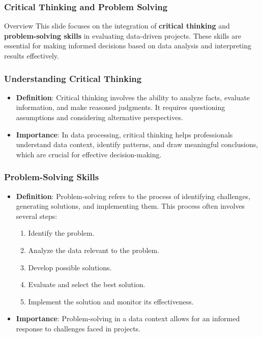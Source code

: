 \documentclass[aspectratio=169]{beamer}
\begin{document}
\begin{frame}[fragile]
    \frametitle{Critical Thinking and Problem Solving}
    \begin{block}{Overview}
        This slide focuses on the integration of \textbf{critical thinking} and \textbf{problem-solving skills} in evaluating data-driven projects. These skills are essential for making informed decisions based on data analysis and interpreting results effectively.
    \end{block}
\end{frame}

\begin{frame}[fragile]
    \frametitle{Understanding Critical Thinking}
    \begin{itemize}
        \item \textbf{Definition}: Critical thinking involves the ability to analyze facts, evaluate information, and make reasoned judgments. It requires questioning assumptions and considering alternative perspectives.
        
        \item \textbf{Importance}: In data processing, critical thinking helps professionals understand data context, identify patterns, and draw meaningful conclusions, which are crucial for effective decision-making.
    \end{itemize}
\end{frame}

\begin{frame}[fragile]
    \frametitle{Problem-Solving Skills}
    \begin{itemize}
        \item \textbf{Definition}: Problem-solving refers to the process of identifying challenges, generating solutions, and implementing them. This process often involves several steps:
        \begin{enumerate}
            \item Identify the problem.
            \item Analyze the data relevant to the problem.
            \item Develop possible solutions.
            \item Evaluate and select the best solution.
            \item Implement the solution and monitor its effectiveness.
        \end{enumerate}
        
        \item \textbf{Importance}: Problem-solving in a data context allows for an informed response to challenges faced in projects.
    \end{itemize}
\end{frame}
\end{document}
